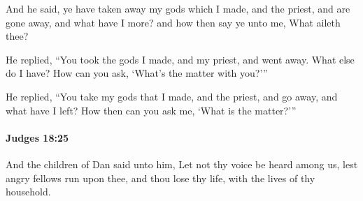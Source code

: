 			\begin{versebox}
					\item[BHS] 
					\item[ASV] And he said, ye have taken away my gods which I made, and the priest, and are gone away, and what have I more? and how then say ye unto me, What aileth thee?
					\item[NIV] He replied, “You took the gods I made, and my priest, and went away. What else do I have? How can you ask, ‘What’s the matter with you?’”
					\item[NRSV] He replied, “You take my gods that I made, and the priest, and go away, and what have I left? How then can you ask me, ‘What is the matter?’”
			\end{versebox}

		\paragraph{Judges 18:25} %
			\label{JUDGES-18-25}

			And the children of Dan said unto him, Let not thy voice be heard among us, lest angry fellows run upon thee, and thou lose thy life, with the lives of thy household.

